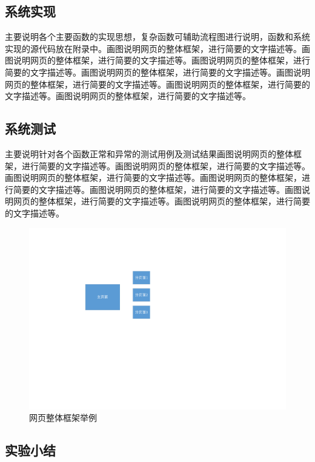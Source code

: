 \documentclass[supercite]{Experimental_Report}
\theoremstyle{definition}
\begin{document}
\subsection{系统实现}

主要说明各个主要函数的实现思想，复杂函数可辅助流程图进行说明，函数和系统实现的源代码放在附录中。画图说明网页的整体框架，进行简要的文字描述等。画图说明网页的整体框架，进行简要的文字描述等。画图说明网页的整体框架，进行简要的文字描述等。画图说明网页的整体框架，进行简要的文字描述等。画图说明网页的整体框架，进行简要的文字描述等。画图说明网页的整体框架，进行简要的文字描述等。画图说明网页的整体框架，进行简要的文字描述等。

\subsection{系统测试}

主要说明针对各个函数正常和异常的测试用例及测试结果画图说明网页的整体框架，进行简要的文字描述等。画图说明网页的整体框架，进行简要的文字描述等。画图说明网页的整体框架，进行简要的文字描述等。画图说明网页的整体框架，进行简要的文字描述等。画图说明网页的整体框架，进行简要的文字描述等。画图说明网页的整体框架，进行简要的文字描述等。画图说明网页的整体框架，进行简要的文字描述等。

\begin{figure}[htb] %
	\begin{center}
		\includegraphics[scale=0.80]{images/1-1.pdf}
		\caption{网页整体框架举例}
		\label{fig4-1}
	\end{center}
\end{figure}

\subsection{实验小结}
\end{document}

